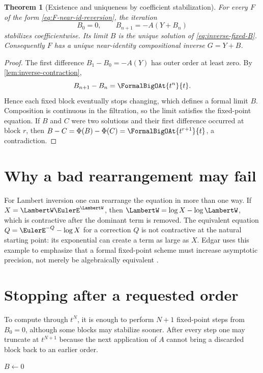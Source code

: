 \documentclass[11pt,oneside]{book}
\newtheorem{theorem}{Theorem}[chapter]
\theoremstyle{definition}
\theoremstyle{remark}
\newcommand{\compinv}{^{\langle-1\rangle_{\circ}}}
\newcommand{\compose}{\mathbin{\circ}}
\newcommand{\trunc}[2]{\left[#1\right]_{\le #2}}
\begin{document}
\begin{theorem}[Existence and uniqueness by coefficient stabilization]
\label{thm:fixed-inverse}
For every $F$ of the form \eqref{eq:F-near-id-reversion}, the iteration
\begin{equation}\label{eq:fixed-inverse-iteration}
 B_0=0,
 \qquad
 B_{n+1}=-A(Y+B_n)
\end{equation}
stabilizes coefficientwise.  Its limit $B$ is the unique solution of
\eqref{eq:inverse-fixed-B}.  Consequently $F$ has a unique near-identity
compositional inverse $G=Y+B$.
\end{theorem}
\begin{proof}
The first difference $B_1-B_0=-A(Y)$ has outer order at least zero.
By \cref{lem:inverse-contraction},
\[
 B_{n+1}-B_n=\FormalBigOAt{t^n}{t}.
\]
Hence each fixed block eventually stops changing, which defines a formal
limit $B$.  Composition is continuous in the filtration, so the limit
satisfies the fixed-point equation.  If $B$ and $C$ were two solutions and
their first difference occurred at block $r$, then
$B-C=\Phi(B)-\Phi(C)=\FormalBigOAt{t^{r+1}}{t}$, a contradiction.
\end{proof}

\section{Why a bad rearrangement may fail}
For Lambert inversion one can rearrange the equation in more than one way.
If $X=\LambertW\EulerE^\LambertW$, then $\LambertW=\log X-\log \LambertW$, which is contractive after the dominant
term is removed.  The equivalent equation $Q=\EulerE^{-Q}-\log X$ for a correction
$Q$ is not contractive at the natural starting point: its exponential can
create a term as large as $X$.  Edgar uses this example to emphasize that a
formal fixed-point scheme must increase asymptotic precision, not merely be
algebraically equivalent \cite{EdgarBeginners}.

\section{Stopping after a requested order}
To compute through $t^N$, it is enough to perform $N+1$ fixed-point steps from
$B_0=0$, although some blocks may stabilize sooner.  After every step one may
truncate at $t^{N+1}$ because the next application of $A$ cannot bring a
discarded block back to an earlier order.

\begin{algorithm}[H]
\caption{Fixed-point compositional inversion}
\label{alg:fixed-inverse}
\KwOut{$G=\trunc{F\compinv}{N}$}
$B\leftarrow0$\;
\For{$j\leftarrow0$ \KwTo $N$}{
  $B\leftarrow\trunc{-\,A\compose(Y+B)}{N}$\;
}
\;
\end{algorithm}
\end{document}

